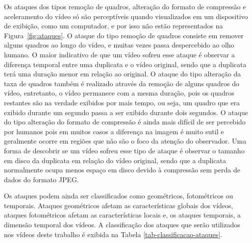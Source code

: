 Os ataques dos tipos remoção de quadros, alteração do formato de compressão e aceleramento do vídeo só são perceptíveis quando visualizados em um dispositivo de exibição, como um computador, e por isso não estão representados na Figura~\ref{fig:ataques}. O ataque do tipo remoção de quadros consiste em remover alguns quadros ao longo do vídeo, e muitas vezes passa despercebido ao olho humano. O maior indicativo de que um vídeo sofreu esse ataque é observar a diferença temporal entre uma duplicata e o vídeo original, sendo que a duplicata terá uma duração menor em relação ao original. O ataque do tipo alteração da taxa de quadros também é realizado através da remoção de alguns quadros do vídeo, entretanto, o vídeo permanece com a mesma duração, pois os quadros restantes são na verdade exibidos por mais tempo, ou seja, um quadro que era exibido durante um segundo passa a ser exibido durante dois segundos. O ataque do tipo alteração do formato de compressão é ainda mais difícil de ser percebido por humanos pois em muitos casos a diferença na imagem é muito sutil e geralmente ocorre em regiões que não são o foco da atenção do observador. Uma forma de descobrir se um vídeo sofreu esse tipo de ataque é observar o tamanho em disco da duplicata em relação do vídeo original, sendo que a duplicata normalmente ocupa menos espaço em disco devido à compressão sem perda de dados do formato JPEG.



Os ataques podem ainda ser classificados como geométricos, fotométricos ou temporais. Ataques geométricos afetam as características globais dos vídeos, ataques fotométricos afetam as características locais e, os ataques temporais, a dimensão temporal dos vídeos. A classificação dos ataques que serão utilizados nos vídeos deste trabalho é exibida na Tabela \ref{tab-classificacao-ataques}.

